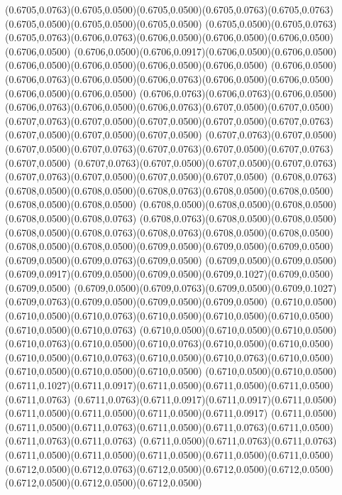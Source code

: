 (0.6705,0.0763)(0.6705,0.0500)(0.6705,0.0500)(0.6705,0.0763)(0.6705,0.0763)(0.6705,0.0500)(0.6705,0.0500)(0.6705,0.0500)
(0.6705,0.0500)(0.6705,0.0763)(0.6705,0.0763)(0.6706,0.0763)(0.6706,0.0500)(0.6706,0.0500)(0.6706,0.0500)(0.6706,0.0500)
(0.6706,0.0500)(0.6706,0.0917)(0.6706,0.0500)(0.6706,0.0500)(0.6706,0.0500)(0.6706,0.0500)(0.6706,0.0500)(0.6706,0.0500)
(0.6706,0.0500)(0.6706,0.0763)(0.6706,0.0500)(0.6706,0.0763)(0.6706,0.0500)(0.6706,0.0500)(0.6706,0.0500)(0.6706,0.0500)
(0.6706,0.0763)(0.6706,0.0763)(0.6706,0.0500)(0.6706,0.0763)(0.6706,0.0500)(0.6706,0.0763)(0.6707,0.0500)(0.6707,0.0500)
(0.6707,0.0763)(0.6707,0.0500)(0.6707,0.0500)(0.6707,0.0500)(0.6707,0.0763)(0.6707,0.0500)(0.6707,0.0500)(0.6707,0.0500)
(0.6707,0.0763)(0.6707,0.0500)(0.6707,0.0500)(0.6707,0.0763)(0.6707,0.0763)(0.6707,0.0500)(0.6707,0.0763)(0.6707,0.0500)
(0.6707,0.0763)(0.6707,0.0500)(0.6707,0.0500)(0.6707,0.0763)(0.6707,0.0763)(0.6707,0.0500)(0.6707,0.0500)(0.6707,0.0500)
(0.6708,0.0763)(0.6708,0.0500)(0.6708,0.0500)(0.6708,0.0763)(0.6708,0.0500)(0.6708,0.0500)(0.6708,0.0500)(0.6708,0.0500)
(0.6708,0.0500)(0.6708,0.0500)(0.6708,0.0500)(0.6708,0.0500)(0.6708,0.0763)
\PST@Solid(0.6708,0.0763)(0.6708,0.0500)(0.6708,0.0500)(0.6708,0.0500)(0.6708,0.0763)(0.6708,0.0763)(0.6708,0.0500)(0.6708,0.0500)
(0.6708,0.0500)(0.6708,0.0500)(0.6709,0.0500)(0.6709,0.0500)(0.6709,0.0500)(0.6709,0.0500)(0.6709,0.0763)(0.6709,0.0500)
(0.6709,0.0500)(0.6709,0.0500)(0.6709,0.0917)(0.6709,0.0500)(0.6709,0.0500)(0.6709,0.1027)(0.6709,0.0500)(0.6709,0.0500)
(0.6709,0.0500)(0.6709,0.0763)(0.6709,0.0500)(0.6709,0.1027)(0.6709,0.0763)(0.6709,0.0500)(0.6709,0.0500)(0.6709,0.0500)
(0.6710,0.0500)(0.6710,0.0500)(0.6710,0.0763)(0.6710,0.0500)(0.6710,0.0500)(0.6710,0.0500)(0.6710,0.0500)(0.6710,0.0763)
(0.6710,0.0500)(0.6710,0.0500)(0.6710,0.0500)(0.6710,0.0763)(0.6710,0.0500)(0.6710,0.0763)(0.6710,0.0500)(0.6710,0.0500)
(0.6710,0.0500)(0.6710,0.0763)(0.6710,0.0500)(0.6710,0.0763)(0.6710,0.0500)(0.6710,0.0500)(0.6710,0.0500)(0.6710,0.0500)
(0.6710,0.0500)(0.6710,0.0500)(0.6711,0.1027)(0.6711,0.0917)(0.6711,0.0500)(0.6711,0.0500)(0.6711,0.0500)(0.6711,0.0763)
(0.6711,0.0763)(0.6711,0.0917)(0.6711,0.0917)(0.6711,0.0500)(0.6711,0.0500)(0.6711,0.0500)(0.6711,0.0500)(0.6711,0.0917)
(0.6711,0.0500)(0.6711,0.0500)(0.6711,0.0763)(0.6711,0.0500)(0.6711,0.0763)(0.6711,0.0500)(0.6711,0.0763)(0.6711,0.0763)
(0.6711,0.0500)(0.6711,0.0763)(0.6711,0.0763)(0.6711,0.0500)(0.6711,0.0500)(0.6711,0.0500)(0.6711,0.0500)(0.6711,0.0500)
(0.6712,0.0500)(0.6712,0.0763)(0.6712,0.0500)(0.6712,0.0500)(0.6712,0.0500)(0.6712,0.0500)(0.6712,0.0500)(0.6712,0.0500)
